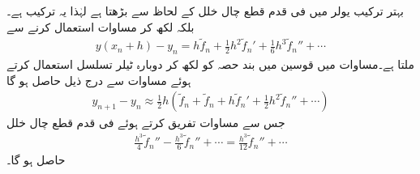 بہتر ترکیب یولر میں فی قدم قطع چال خلل  کے لحاظ سے بڑھتا ہے لہٰذا یہ ترکیب  ہے۔ بلکہ  لکھ کر  مساوات  استعمال کرنے سے
\begin{align}\label{مساوات_اعدادی_بہتر_یولر_پ}
y(x_n+h)-y_n=h\tilde{f}_n+\frac{1}{2}h^2\tilde{f}_n'+\frac{1}{6}h^3\tilde{f}_n''+\cdots
\end{align}
ملتا ہے۔مساوات  میں قوسین میں بند حصہ کو  لکھ کر دوبارہ ٹیلر تسلسل استعمال کرتے ہوئے مساوات  سے  درج ذیل حاصل ہو گا 
\begin{align}\label{مساوات_اعدادی_بہتر_یولر_ت}
y_{n+1}-y_n\approx \frac{1}{2}h(\tilde{f}_n+\tilde{f}_n+h\tilde{f}_n'+\frac{1}{2}h^2\tilde{f}_n''+\cdots)
\end{align}
جس سے مساوات  تفریق کرتے ہوئے فی قدم قطع  چال خلل
\begin{align*}
\frac{h^3}{4}\tilde{f}_n''-\frac{h^3}{6}\tilde{f}_n''+\cdots=\frac{h^3}{12}\tilde{f}_n''+\cdots
\end{align*}
حاصل ہو گا۔ 

